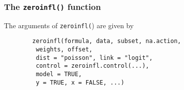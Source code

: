\documentclass[MASTER.tex]{subfiles}
\begin{document}
%	
\begin{frame}[fragile]
	\frametitle{The \texttt{zeroinfl()} function}
	
	The arguments of \texttt{zeroinfl(}) are given
	by
	\begin{framed}
		\begin{verbatim}
		zeroinfl(formula, data, subset, na.action, 
	  	 weights, offset,
		 dist = "poisson", link = "logit", 
		 control = zeroinfl.control(...),
		 model = TRUE, 
		 y = TRUE, x = FALSE, ...)
		\end{verbatim}
	\end{framed}
	
\end{frame}

% 	
\end{document}
